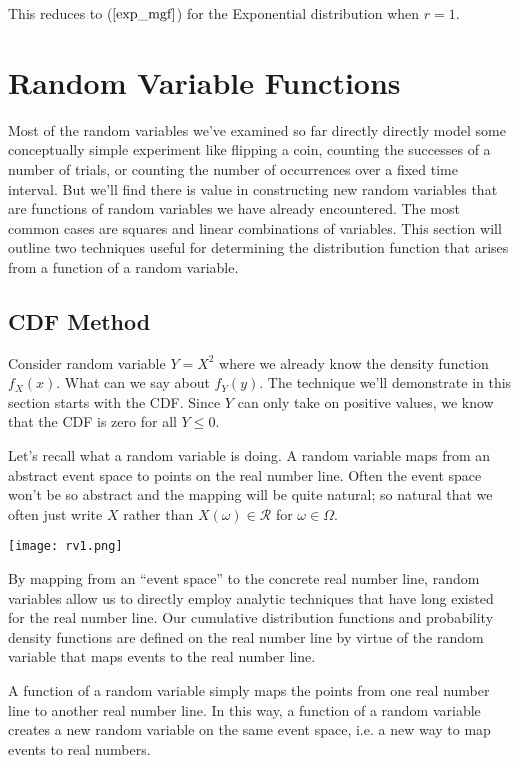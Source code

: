 \documentclass[]{article}
\begin{document}
This reduces to ($\ref{exp_mgf}$) for the Exponential distribution
when $r=1$.


\section{Random Variable Functions}

Most of the random variables we've examined so far directly
directly model some conceptually simple experiment like
flipping a coin, counting the successes of a number of trials,
or counting the number of occurrences over a fixed time interval.
But we'll find there is value in constructing new random variables
that are functions of random variables we have already encountered.
The most common cases are squares and linear
combinations of variables.  This section will outline two
techniques useful for determining the distribution function
that arises from a function of a random variable.

\subsection{CDF Method}

Consider random variable $Y = X^2$ where we already know
the density function $f_X(x)$. What can we say about $f_Y(y)$.
The technique we'll demonstrate in this section starts with
the CDF.  Since $Y$ can only take on positive values, we know
that the CDF is zero for all $Y \le 0$.

Let's recall what a random variable is doing.
A random variable maps from an abstract event space to points on
the real number line.  Often the event space won't be so abstract
and the mapping will be quite natural; so natural that we often just
write $X$ rather than
$X(\omega) \in \mathcal{R}$ for $\omega \in \Omega$.

\texttt{[image: rv1.png]}

By mapping from an ``event space'' to the concrete real number line,
random variables allow us to directly employ analytic techniques
that have long existed for the real number line.  Our
cumulative distribution functions and probability density functions
are defined on the real number line by virtue of the random variable
that maps events to the real number line.

A function of a random variable simply maps the points from one
real number line to another real number line.  In this way, a function
of a random variable creates a new random variable on the same event
space, i.e. a new way to map events to real numbers.
\end{document}

